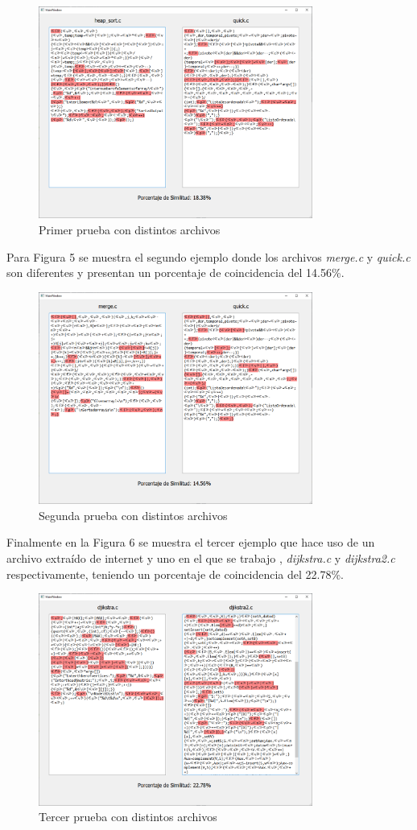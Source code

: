 \documentclass[12pt,twoside]{article}
\begin{document}
    \begin{figure}[H]
        \centering
        \includegraphics[width=9cm]{imagenes/i3.png}
        \caption{Primer prueba con distintos archivos}
    \end{figure}
    Para Figura 5 se muestra el segundo ejemplo donde los archivos {\it merge.c} y {\it quick.c} son diferentes y presentan un porcentaje de coincidencia del 14.56\%.
    \begin{figure}[H]
        \centering
        \includegraphics[width=9cm]{imagenes/i4.png}
        \caption{Segunda prueba con distintos archivos}
    \end{figure}
    Finalmente en la Figura 6 se muestra el tercer ejemplo que hace uso de un archivo extra\'ido de internet  y uno en el que se trabajo , {\it dijkstra.c} y {\it dijkstra2.c} respectivamente, teniendo un porcentaje de coincidencia del 22.78\%.
    \begin{figure}[H]
        \centering
        \includegraphics[width=9cm]{imagenes/i5.png}
        \caption{Tercer prueba con distintos archivos}
    \end{figure}
\end{document}
